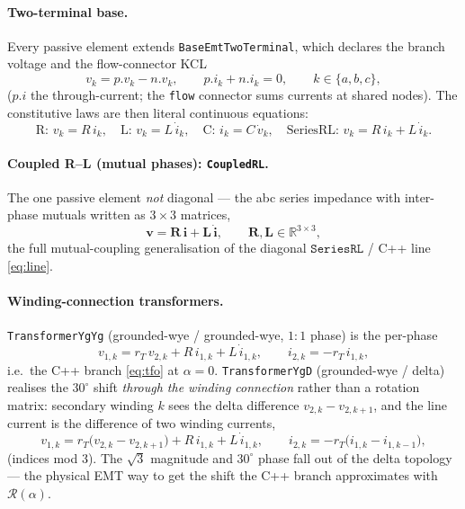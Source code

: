 \documentclass[11pt]{article}
\begin{document}
\paragraph{Two-terminal base.} Every passive element extends
\texttt{BaseEmtTwoTerminal}, which declares the branch voltage and the
flow-connector KCL
\begin{equation}
v_k = p.v_k - n.v_k,\qquad p.i_k + n.i_k = 0,\qquad k\in\{a,b,c\},
\label{eq:base2t}
\end{equation}
($p.i$ the through-current; the \texttt{flow} connector sums currents at shared
nodes). The constitutive laws are then literal continuous equations:
\begin{equation}
\text{R: } v_k=R\,i_k,\quad
\text{L: } v_k=L\,\dot i_k,\quad
\text{C: } i_k=C\,\dot v_k,\quad
\text{SeriesRL: } v_k=R\,i_k+L\,\dot i_k .
\label{eq:rlc}
\end{equation}

\paragraph{Coupled R--L (mutual phases): \texttt{CoupledRL}.} The one passive
element \emph{not} diagonal --- the abc series impedance with inter-phase mutuals
written as $3\times3$ matrices,
\begin{equation}
\mathbf v = \mathbf R\,\mathbf i + \mathbf L\,\dot{\mathbf i},
\qquad \mathbf R,\mathbf L\in\mathbb R^{3\times3},
\label{eq:coupledrl}
\end{equation}
the full mutual-coupling generalisation of the diagonal $\texttt{SeriesRL}$ /
C++ line \eqref{eq:line}.

\paragraph{Winding-connection transformers.}
\texttt{TransformerYgYg} (grounded-wye / grounded-wye, $1{:}1$ phase) is the
per-phase
\begin{equation}
v_{1,k}=r_T\,v_{2,k}+R\,i_{1,k}+L\,\dot i_{1,k},
\qquad i_{2,k}=-r_T\,i_{1,k},
\label{eq:ygyg}
\end{equation}
i.e.\ the C++ branch \eqref{eq:tfo} at $\alpha=0$. \texttt{TransformerYgD}
(grounded-wye / delta) realises the $30^\circ$ shift \emph{through the winding
connection} rather than a rotation matrix: secondary winding $k$ sees the delta
difference $v_{2,k}-v_{2,k+1}$, and the line current is the difference of two
winding currents,
\begin{equation}
v_{1,k}=r_T\big(v_{2,k}-v_{2,k+1}\big)+R\,i_{1,k}+L\,\dot i_{1,k},
\qquad
i_{2,k}=-r_T\big(i_{1,k}-i_{1,k-1}\big),
\label{eq:ygd}
\end{equation}
(indices mod 3). The $\sqrt3$ magnitude and $30^\circ$ phase fall out of the
delta topology --- the physical EMT way to get the shift the C++ branch
approximates with $\mathcal R(\alpha)$.
\end{document}

